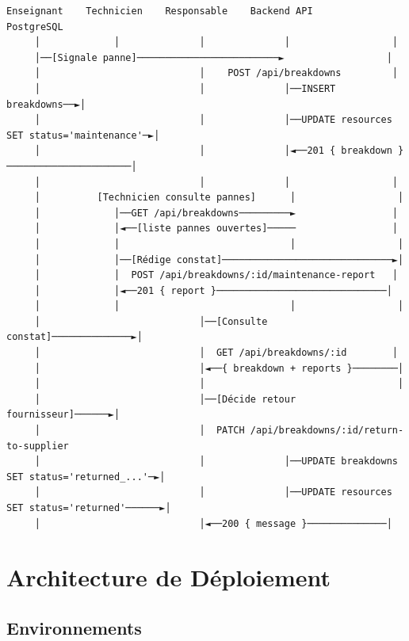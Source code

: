 \documentclass[12pt,a4paper]{report}
\begin{document}
\begin{verbatim}
Enseignant    Technicien    Responsable    Backend API         PostgreSQL
     │             │              │              │                  │
     │──[Signale panne]─────────────────────────►                  │
     │                            │    POST /api/breakdowns         │
     │                            │              │──INSERT breakdowns──►│
     │                            │              │──UPDATE resources SET status='maintenance'─►│
     │                            │              │◄──201 { breakdown }──────────────────────│
     │                            │              │                  │
     │          [Technicien consulte pannes]      │                  │
     │             │──GET /api/breakdowns─────────►                 │
     │             │◄──[liste pannes ouvertes]─────                 │
     │             │                              │                  │
     │             │──[Rédige constat]──────────────────────────────►│
     │             │  POST /api/breakdowns/:id/maintenance-report   │
     │             │◄──201 { report }──────────────────────────────│
     │             │                              │                  │
     │                            │──[Consulte constat]──────────────►│
     │                            │  GET /api/breakdowns/:id        │
     │                            │◄──{ breakdown + reports }────────│
     │                            │                                  │
     │                            │──[Décide retour fournisseur]──────►│
     │                            │  PATCH /api/breakdowns/:id/return-to-supplier
     │                            │              │──UPDATE breakdowns SET status='returned_...'─►│
     │                            │              │──UPDATE resources SET status='returned'──────►│
     │                            │◄──200 { message }──────────────│
\end{verbatim}

\chapter{Architecture de Déploiement}

\section{Environnements}
\end{document}
